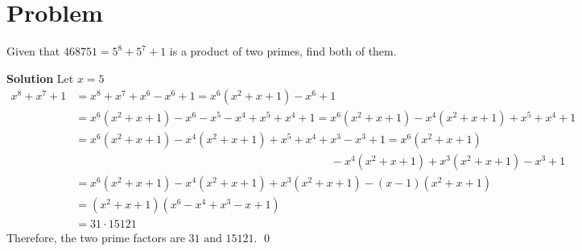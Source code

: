 \documentclass{article}
\newenvironment{solution}{\begin{trivlist}\item[]
{\bf Solution}}{\qed \end{trivlist}}
\begin{document}
\newpage
\section*{Problem}
Given that $468751=5^8+5^7+1$ is a product of two
primes, find both of them.
\begin{solution}
Let $x=5$
\begin{align*}
    x^8 + x^7 + 1
    &= x^8 + x^7 + x^6 - x^6 + 1
    = x^6 (x^2 + x + 1) - x^6 + 1 \\
    &= x^6 (x^2 + x + 1) - x^6 - x^5 - x^4 + x^5 + x^4 + 1
        = x^6 (x^2 + x + 1) - x^4 (x^2 + x + 1)
        + x^5 + x^4 + 1 \\
    &= x^6 (x^2 + x + 1) - x^4 (x^2 + x + 1)
        + x^5 + x^4 + x^3 - x^3 + 1 = x^6 (x^2 + x + 1) \\
    &\qquad \qquad \qquad \qquad \qquad \qquad \qquad
     \qquad \qquad \qquad \qquad
     \text{ } - x^4 (x^2 + x + 1)
     + x^3 (x^2 + x + 1) - x^3 + 1 \\
    &= x^6 (x^2 + x + 1) - x^4 (x^2 + x + 1)
        + x^3 (x^2 + x + 1) - (x - 1)(x^2 + x + 1) \\
    &= (x^2 + x + 1)(x^6 - x^4 + x^3 - x + 1) \\
    &= 31 \cdot 15121
\end{align*}
Therefore, the two prime factors are
$\boxed{31 \text{ and } 15121}$.
\end{solution}
\end{document}
